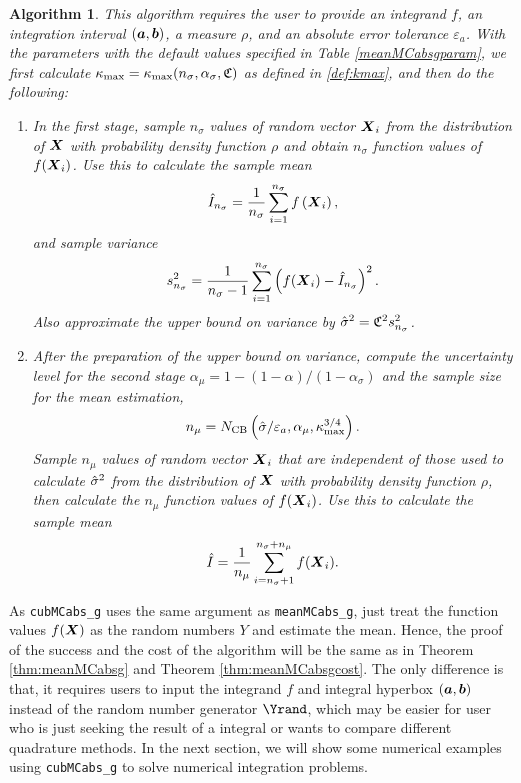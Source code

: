 \documentclass{iitthesis}
\newtheorem{algorithm}[theorem]{Algorithm}
\theoremstyle{definition}
\begin{document}
\begin{algorithm}\label{alg:cubMCabsg} 
This algorithm requires the user to provide an integrand $f$, an integration interval $(\boldsymbol{a},\boldsymbol{b})$, a measure $\rho$, and an absolute error tolerance $\varepsilon_a$. With the parameters with the default values specified in Table \ref{meanMCabsgparam}, we first calculate $\kappa_{\max}=\kappa_{\max}(n_\sigma,\alpha_\sigma,\mathfrak{C})$ as defined in \eqref{def:kmax}, and then do the following:
\begin{enumerate}
\item In the first stage, sample $n_\sigma$ values of random vector $\boldsymbol{X}_i$ from the distribution of $\boldsymbol{X}$ with probability density function $\rho$ and obtain $n_\sigma$ function values of $f(\boldsymbol{X}_i)$. Use this to calculate the sample mean $$\hat{I}_{n_\sigma} = \frac{1}{n_\sigma}\sum_{i=1}^{n_\sigma} f\left(\boldsymbol{X}_i\right),$$ and sample variance $$s_{n_\sigma}^2 = \frac{1}{n_\sigma-1}\sum_{i=1}^{n_\sigma} \left(f(\boldsymbol{X}_i)-\hat{I}_{n_\sigma}\right)^2.$$ Also approximate the upper bound on variance by $\hat{\sigma}^2 = \mathfrak{C}^2 s^2_{n_\sigma}$. 

\item After the preparation of the upper bound on variance, compute the uncertainty level for the second stage $\alpha_\mu = 1-(1-\alpha)/(1-\alpha_{\sigma})$ and the sample size for the mean estimation,
\begin{align}
n_\mu = N_{\text{CB}} \left(\hat{\sigma}/\varepsilon_a,\alpha_\mu, \kappa_{\max}^{3/4}\right).
\end{align}
Sample $n_\mu$ values of random vector $\boldsymbol{X}_i$ that are independent of those used to calculate $\hat{\sigma}^2$ from the distribution of $\boldsymbol{X}$ with probability density function $\rho$, then calculate the $n_\mu$ function values of $f(\boldsymbol{X}_i)$. Use this to calculate the sample mean 
\begin{align}\label{hmun}
\hat{I}= \frac{1}{n_\mu}\sum_{i = n_\sigma+1}^{n_\sigma+n_\mu}f(\boldsymbol{X}_i).
\end{align}
\end{enumerate}
\end{algorithm}
As {\tt cubMCabs\_g} uses the same argument as {\tt meanMCabs\_g}, just treat the function values $f(\boldsymbol{X}) $ as the random numbers $Y$ and estimate the mean. Hence, the proof of the success and the cost of the algorithm will be the same as in Theorem \ref{thm:meanMCabsg} and Theorem \ref{thm:meanMCabsgcost}. The only difference is that, it requires users to input the integrand $f$ and integral hyperbox $(\boldsymbol{a},\boldsymbol{b})$ instead of the random number generator $\Yrand$, which may be easier for user who is just seeking the result of a integral or wants to compare different quadrature methods. In the next section, we will show some numerical examples using {\tt cubMCabs\_g} to solve numerical integration problems.
\end{document}
